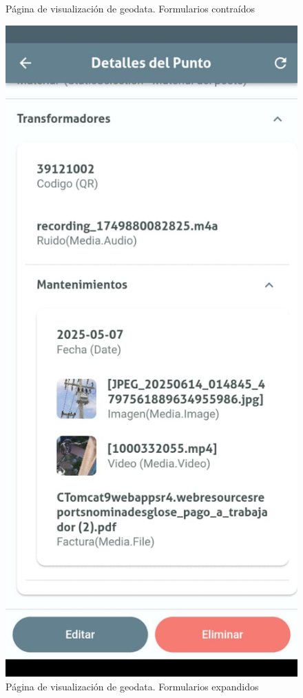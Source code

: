 \documentclass{article}
\begin{document}
\begin{figure}[H]
\begin{minipage}[b]{0.3\textwidth}
    \caption{Página de visualización de geodata. Formularios contraídos}
    \label{fig:geodataview1}
  \end{minipage}
  \hspace{0.02\textwidth}
  \begin{minipage}[b]{0.3\textwidth}
    \centering
    \includegraphics[width=\textwidth]{images/functionality_test/geodata_view2.jpg}
    \caption{Página de visualización de geodata. Formularios expandidos}
    \label{fig:geodataview2}
  \end{minipage}
\end{figure}
\end{document}
